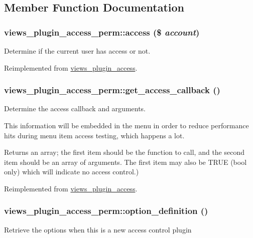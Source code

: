 \subsection{Member Function Documentation}
\hypertarget{classviews__plugin__access__perm_ac5b655153815ade74513b1af48c18cad}{
\subsubsection[{access}]{\setlength{\rightskip}{0pt plus 5cm}views\_\-plugin\_\-access\_\-perm::access (\$ {\em account})}}
\label{classviews__plugin__access__perm_ac5b655153815ade74513b1af48c18cad}
Determine if the current user has access or not. 

Reimplemented from \hyperlink{classviews__plugin__access_ad24d38c1b1a1bd7527b2b96a2103cede}{views\_\-plugin\_\-access}.\hypertarget{classviews__plugin__access__perm_ac9dce994826265f48711a23cf3f2414f}{
\subsubsection[{get\_\-access\_\-callback}]{\setlength{\rightskip}{0pt plus 5cm}views\_\-plugin\_\-access\_\-perm::get\_\-access\_\-callback ()}}
\label{classviews__plugin__access__perm_ac9dce994826265f48711a23cf3f2414f}
Determine the access callback and arguments.

This information will be embedded in the menu in order to reduce performance hits during menu item access testing, which happens a lot.

\begin{DoxyReturn}{Returns}
an array; the first item should be the function to call, and the second item should be an array of arguments. The first item may also be TRUE (bool only) which will indicate no access control.) 
\end{DoxyReturn}


Reimplemented from \hyperlink{classviews__plugin__access_ad4038a32fccc6a662a74f437d0bf6a23}{views\_\-plugin\_\-access}.\hypertarget{classviews__plugin__access__perm_a7fb275a2bd4c2858064b8d4120ad8f22}{
\subsubsection[{option\_\-definition}]{\setlength{\rightskip}{0pt plus 5cm}views\_\-plugin\_\-access\_\-perm::option\_\-definition ()}}
\label{classviews__plugin__access__perm_a7fb275a2bd4c2858064b8d4120ad8f22}
Retrieve the options when this is a new access control plugin 

